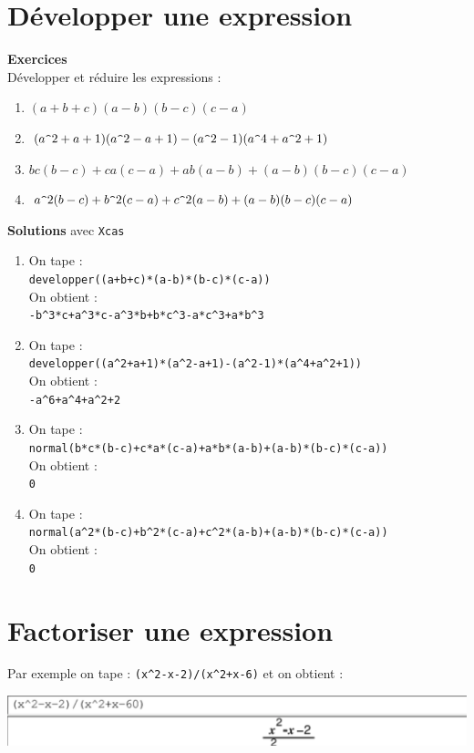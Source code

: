 \documentclass[a4paper,11pt]{book}
\begin{document}
\section{D\'evelopper une expression}
{\bf Exercices}\\
D\'evelopper et r\'eduire les expressions :
\begin{enumerate}
\item $(a+b+c)(a-b)(b-c)(c-a)$
\item $(a\verb|^|2+a+1)(a\verb|^|2-a+1)-(a\verb|^|2-1)(a\verb|^|4+a\verb|^|2+1)$
\item $bc(b-c)+ca(c-a)+ab(a-b)+(a-b)(b-c)(c-a)$
\item $a\verb|^|2(b-c)+b\verb|^|2(c-a)+c\verb|^|2(a-b)+(a-b)(b-c)(c-a)$
\end{enumerate}
{\bf Solutions} avec {\tt Xcas}
\begin{enumerate}
\item On tape :\\
{\tt developper((a+b+c)*(a-b)*(b-c)*(c-a))}\\
On obtient :\\
{\tt -b\verb|^|3*c+a\verb|^|3*c-a\verb|^|3*b+b*c\verb|^|3-a*c\verb|^|3+a*b\verb|^|3}
\item On tape :\\
{\tt developper((a\verb|^|2+a+1)*(a\verb|^|2-a+1)-(a\verb|^|2-1)*(a\verb|^|4+a\verb|^|2+1))}\\
On obtient :\\
{\tt -a\verb|^|6+a\verb|^|4+a\verb|^|2+2}
\item On tape :\\
{\tt normal(b*c*(b-c)+c*a*(c-a)+a*b*(a-b)+(a-b)*(b-c)*(c-a))}\\
On obtient :\\
{\tt 0}
\item On tape :\\
{\tt normal(a\verb|^|2*(b-c)+b\verb|^|2*(c-a)+c\verb|^|2*(a-b)+(a-b)*(b-c)*(c-a))}\\
On obtient :\\
{\tt 0}
\end{enumerate}
\section{Factoriser une expression}
Par exemple on tape :
{\tt (x\verb|^|2-x-2)/(x\verb|^|2+x-6)}
et on obtient :
\begin{center}\includegraphics[width=\textwidth]{factoriser}\end{center}
\end{document}
